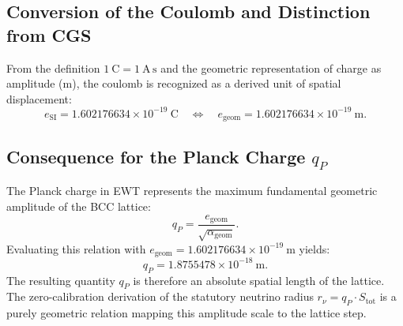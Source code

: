 \documentclass[10pt,a4paper]{article}
\begin{document}
\subsection{Conversion of the Coulomb and Distinction from CGS}
\label{sec:coulomb_conversion}

From the definition $1\ \text{C} = 1\ \text{A}\,\text{s}$ and the geometric
representation of charge as amplitude ($\text{m}$), the coulomb is recognized
as a derived unit of spatial displacement:
\begin{equation}
	e_{\text{SI}} = 1.602176634 \times 10^{-19}\ \text{C}
	\quad \Longleftrightarrow \quad
	e_{\text{geom}} = 1.602176634 \times 10^{-19}\ \text{m}.
\end{equation}

\begin{center}
\end{center}

\subsection{Consequence for the Planck Charge $q_P$}
\label{sec:qP_consequence}

The Planck charge in EWT represents the maximum fundamental geometric amplitude
of the BCC lattice:
\begin{equation}
	q_P = \frac{e_{\text{geom}}}{\sqrt{\alpha_{\text{geom}}}}.
\end{equation}
Evaluating this relation with $e_{\text{geom}} = 1.602176634 \times 10^{-19}\ \text{m}$ yields:
\begin{equation}
	q_P = 1.8755478 \times 10^{-18}\ \text{m}.
\end{equation}
The resulting quantity $q_P$ is therefore an absolute spatial length of the lattice.
The zero-calibration derivation of the statutory neutrino radius $r_\nu = q_P \cdot S_{\text{tot}}$
is a purely geometric relation mapping this amplitude scale to the lattice step.
\end{document}
